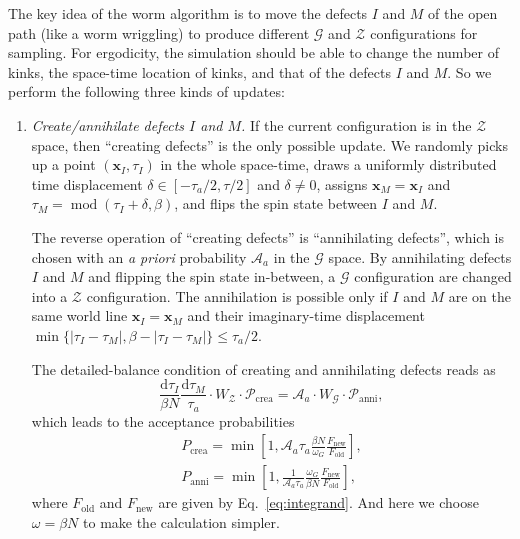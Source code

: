\documentclass{article}
\DeclareMathOperator{\Mod}{mod}
\theoremstyle{plain} \newtheorem{thm}{Theorem}[section]
\theoremstyle{definition} \newtheorem{df}{Definition}[section]
\theoremstyle{definition} \newtheorem{eg}{Example}
\theoremstyle{remark} \newtheorem*{rmk}{Remark}
\begin{document}
The key idea of the worm algorithm is to move the defects $I$ and $M$ of the open path (like a worm wriggling) to produce different $\mathcal{G}$ and $\mathcal{Z}$ configurations for sampling. For ergodicity, the simulation should be able to change the number of kinks, the space-time location of kinks, and that of the defects $I$ and $M$. So we perform the following three kinds of updates:
\begin{enumerate}
  \item \textit{Create/annihilate defects $I$ and $M$.}
    If the current configuration is in the $\mathcal{Z}$ space, then ``creating defects'' is the only possible update. We randomly picks up a point $(\bm{x}_I, \tau_I)$ in the whole space-time, draws a uniformly distributed time displacement $\delta \in [-\tau_a/2, \tau/2]$ and $\delta \ne 0$, assigns $\bm{x}_M = \bm{x}_I$ and $\tau_M = \Mod(\tau_I+\delta, \beta)$, and flips the spin state between $I$ and $M$.

    The reverse operation of ``creating defects'' is ``annihilating defects'', which is chosen with an \textit{a priori} probability $\mathcal{A}_a$ in the $\mathcal{G}$ space. By annihilating defects $I$ and $M$ and flipping the spin state in-between, a $\mathcal{G}$ configuration are changed into a $\mathcal{Z}$ configuration. The annihilation is possible only if $I$ and $M$ are on the same world line $\bm{x}_I = \bm{x}_M$ and their imaginary-time displacement $\min\{|\tau_I-\tau_M|, \beta-|\tau_I-\tau_M|\} \le \tau_a/2$.

    The detailed-balance condition of creating and annihilating defects reads as
    \begin{equation}
      \frac{\mathrm{d}\tau_I}{\beta N}\frac{\mathrm{d}\tau_M}{\tau_a}\cdot W_\mathcal{Z}\cdot\mathcal{P}_\text{crea} = \mathcal{A}_a\cdot W_\mathcal{G}\cdot\mathcal{P}_\text{anni},
    \end{equation}
    which leads to the acceptance probabilities
    \begin{gather}
      P_\text{crea} = \min \left[ 1, \mathcal{A}_a \tau_a \frac{\beta N}{\omega_G}\frac{F_\text{new}}{F_\text{old}} \right],\\
      P_\text{anni} = \min\left[ 1, \frac{1}{\mathcal{A}_a \tau_a}\frac{\omega_G}{\beta N}\frac{F_\text{new}}{F_\text{old}} \right],
    \end{gather}
    where $F_\text{old}$ and $F_\text{new}$ are given by Eq.~\ref{eq:integrand}. And here we choose $\omega = \beta N$ to make the calculation simpler.


\end{enumerate}
\end{document}
